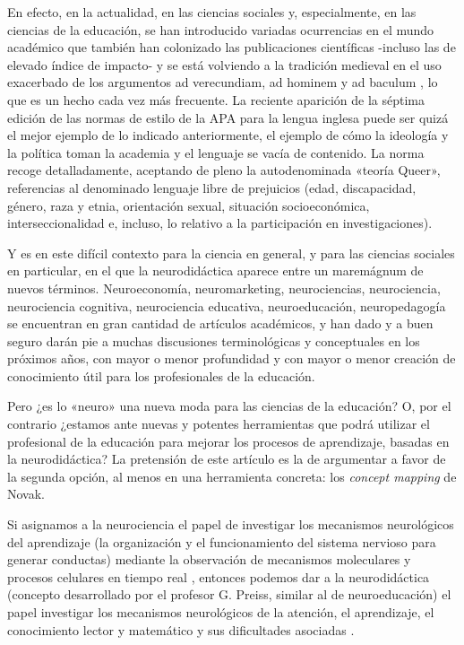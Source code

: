 \documentclass[spanish]{textolivre}
\begin{document}
En efecto, en la actualidad, en las ciencias sociales y, especialmente, en las ciencias de la educación, se han introducido variadas ocurrencias en el mundo académico que también han colonizado las publicaciones científicas -incluso las de elevado índice de impacto- y se está volviendo a la tradición medieval en el uso exacerbado de los argumentos ad verecundiam, ad hominem y ad baculum \cite[p.~564]{puerta2020}, %
lo que es un hecho cada vez más frecuente. La reciente aparición de la séptima edición de las normas de estilo de la APA para la lengua inglesa puede ser quizá el mejor ejemplo de lo indicado anteriormente, el ejemplo de cómo la ideología y la política toman la academia y el lenguaje se vacía de contenido. La norma recoge detalladamente, aceptando de pleno la autodenominada «teoría Queer», referencias al denominado lenguaje libre de prejuicios (edad, discapacidad, género, raza y etnia, orientación sexual, situación socioeconómica, interseccionalidad e, incluso, lo relativo a la participación en investigaciones).

Y es en este difícil contexto para la ciencia en general, y para las ciencias sociales en particular, en el que la neurodidáctica aparece entre un maremágnum de nuevos términos. Neuroeconomía, neuromarketing, neurociencias, neurociencia, neurociencia cognitiva, neurociencia educativa, neuroeducación, neuropedagogía \cite{santana2019disenos} %
se encuentran en gran cantidad de artículos académicos, y han dado y a buen seguro darán pie a muchas discusiones terminológicas y conceptuales en los próximos años, con mayor o menor profundidad y con mayor o menor creación de conocimiento útil para los profesionales de la educación.

Pero ¿es lo «neuro» una nueva moda para las ciencias de la educación? O, por el contrario ¿estamos ante nuevas y potentes herramientas que podrá utilizar el profesional de la educación para mejorar los procesos de aprendizaje, basadas en la neurodidáctica? La pretensión de este artículo es la de argumentar a favor de la segunda opción, al menos en una herramienta concreta: los \textit{concept mapping} de Novak.

Si asignamos a la neurociencia el papel de investigar los mecanismos neurológicos del aprendizaje (la organización y el funcionamiento del sistema nervioso para generar conductas) mediante la observación de mecanismos moleculares y procesos celulares en tiempo real \cite{goswami2006neuroscience}, %
entonces podemos dar a la neurodidáctica (concepto desarrollado por el profesor G. Preiss, similar al de neuroeducación) el papel investigar los mecanismos neurológicos de la atención, el aprendizaje, el conocimiento lector y matemático y sus dificultades asociadas \cite{preiss1996neurodidaktik}.%
\end{document}

